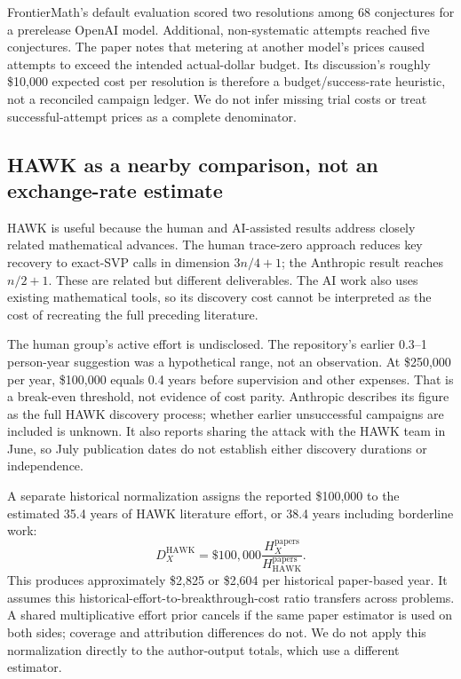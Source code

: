 \documentclass[11pt,letterpaper]{article}
\begin{document}
FrontierMath's default evaluation scored two resolutions among 68 conjectures for a prerelease OpenAI model. Additional, non-systematic attempts reached five conjectures. The paper notes that metering at another model's prices caused attempts to exceed the intended actual-dollar budget. Its discussion's roughly \$10,000 expected cost per resolution is therefore a budget/success-rate heuristic, not a reconciled campaign ledger. We do not infer missing trial costs or treat successful-attempt prices as a complete denominator.\cite{epoch2026}

\subsection{HAWK as a nearby comparison, not an exchange-rate estimate}
HAWK is useful because the human and AI-assisted results address closely related mathematical advances. The human trace-zero approach reduces key recovery to exact-SVP calls in dimension $3n/4+1$; the Anthropic result reaches $n/2+1$. These are related but different deliverables.\cite{trace2026,hawk2026} The AI work also uses existing mathematical tools, so its discovery cost cannot be interpreted as the cost of recreating the full preceding literature.

The human group's active effort is undisclosed. The repository's earlier 0.3--1 person-year suggestion was a hypothetical range, not an observation. At \$250,000 per year, \$100,000 equals 0.4 years before supervision and other expenses. That is a break-even threshold, not evidence of cost parity. Anthropic describes its figure as the full HAWK discovery process; whether earlier unsuccessful campaigns are included is unknown. It also reports sharing the attack with the HAWK team in June, so July publication dates do not establish either discovery durations or independence.\cite{anthropic2026}

A separate historical normalization assigns the reported \$100,000 to the estimated 35.4 years of HAWK literature effort, or 38.4 years including borderline work:
\begin{equation}
 D^{\mathrm{HAWK}}_X=\$100{,}000\frac{H^{\mathrm{papers}}_X}{H^{\mathrm{papers}}_{\mathrm{HAWK}}}.
\end{equation}
This produces approximately \$2,825 or \$2,604 per historical paper-based year. It assumes this historical-effort-to-breakthrough-cost ratio transfers across problems. A shared multiplicative effort prior cancels if the same paper estimator is used on both sides; coverage and attribution differences do not. We do not apply this normalization directly to the author-output totals, which use a different estimator.
\end{document}
